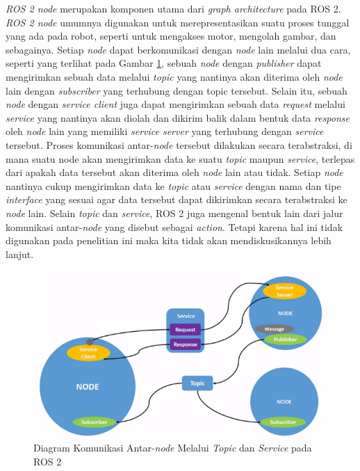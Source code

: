 \textit{ROS 2 node} merupakan komponen utama dari \textit{graph architecture} pada ROS 2. \textit{ROS 2 node} umumnya digunakan untuk
merepresentasikan suatu proses tunggal yang ada pada robot, seperti untuk mengakses motor, mengolah gambar, dan sebagainya.
Setiap \textit{node} dapat berkomunikasi dengan \textit{node} lain melalui dua cara, seperti yang terlihat pada Gambar \ref{fig:ros2node}, sebuah \textit{node} dengan \textit{publisher} dapat mengirimkan sebuah data melalui
\textit{topic} yang nantinya akan diterima oleh \textit{node} lain dengan \textit{subscriber} yang terhubung dengan topic tersebut. Selain itu, sebuah \textit{node}
dengan \textit{service client} juga dapat mengirimkan sebuah data \textit{request} melalui \textit{service} yang nantinya akan diolah dan dikirim balik dalam
bentuk data \textit{response} oleh \textit{node} lain yang memiliki \textit{service server} yang terhubung dengan \textit{service} tersebut.
Proses komunikasi antar-\textit{node} tersebut dilakukan secara terabstraksi, di mana suatu node akan mengirimkan data ke suatu \textit{topic} maupun \textit{service}, terlepas dari apakah data tersebut
akan diterima oleh \textit{node} lain atau tidak. Setiap \textit{node} nantinya cukup mengirimkan data ke \textit{topic} atau \textit{service} dengan nama dan tipe
\textit{interface} yang sesuai agar data tersebut dapat dikirimkan secara terabstraksi ke \textit{node} lain.
Selain \textit{topic} dan \textit{service}, ROS 2 juga mengenal bentuk lain dari jalur komunikasi antar-\textit{node} yang disebut sebagai \textit{action}. Tetapi karena hal ini tidak digunakan pada penelitian ini maka kita tidak akan mendiskusikannya lebih lanjut. 
\begin{figure}[ht]
  \centering
  \includegraphics[scale=0.9]{gambar/ros2_node.png}
  \caption{Diagram Komunikasi Antar-\textit{node} Melalui \textit{Topic} dan \textit{Service} pada ROS 2}
  \label{fig:ros2node}
\end{figure}

